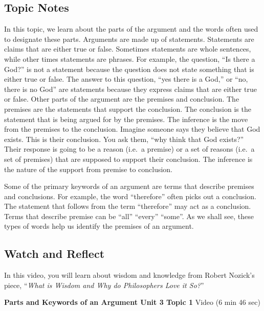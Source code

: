 \documentclass[
]{book}
\begin{document}
\hypertarget{topic-notes-8}{%
\subsection*{Topic Notes}\label{topic-notes-8}}

In this topic, we learn about the parts of the argument and the words often used to designate these parts. Arguments are made up of statements. Statements are claims that are either true or false. Sometimes statements are whole sentences, while other times statements are phrases. For example, the question, ``Is there a God?'' is not a statement because the question does not state something that is either true or false. The answer to this question, ``yes there is a God,'' or ``no, there is no God'' are statements because they express claims that are either true or false. Other parts of the argument are the premises and conclusion. The premises are the statements that support the conclusion. The conclusion is the statement that is being argued for by the premises. The inference is the move from the premises to the conclusion. Imagine someone says they believe that God exists. This is their conclusion. You ask them, ``why think that God exists?'' Their response is going to be a reason (i.e.~a premise) or a set of reasons (i.e.~a set of premises) that are supposed to support their conclusion. The inference is the nature of the support from premise to conclusion.

Some of the primary keywords of an argument are terms that describe premises and conclusions. For example, the word ``therefore'' often picks out a conclusion. The statement that follows from the term ``therefore'' may act as a conclusion. Terms that describe premise can be ``all'' ``every'' ``some''. As we shall see, these types of words help us identify the premises of an argument.

\hypertarget{watch-and-reflect-14}{%
\subsection*{Watch and Reflect}\label{watch-and-reflect-14}}

In this video, you will learn about wisdom and knowledge from Robert Nozick's piece, ``\emph{What is Wisdom and Why do Philosophers Love it So?}''

\textbf{Parts and Keywords of an Argument Unit 3 Topic 1} Video (6 min 46 sec)
\end{document}
